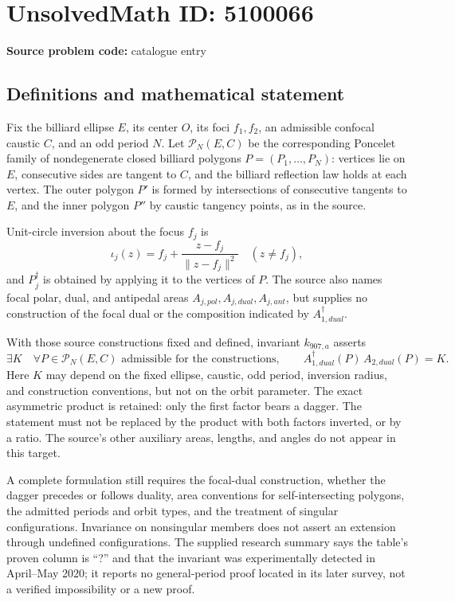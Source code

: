 \documentclass[11pt]{article}
\begin{document}
\section*{UnsolvedMath ID: 5100066}
\textbf{Source problem code:} catalogue entry
\subsection{Definitions and mathematical statement}
Fix the billiard ellipse \(E\), its center \(O\), its foci \(f_1,f_2\), an admissible confocal caustic \(C\), and an odd period \(N\). Let \(\mathcal P_N(E,C)\) be the corresponding Poncelet family of nondegenerate closed billiard polygons \(P=(P_1,\ldots,P_N)\): vertices lie on \(E\), consecutive sides are tangent to \(C\), and the billiard reflection law holds at each vertex. The outer polygon \(P'\) is formed by intersections of consecutive tangents to \(E\), and the inner polygon \(P''\) by caustic tangency points, as in the source.

Unit-circle inversion about the focus \(f_j\) is
\[
\iota_j(z)=f_j+\frac{z-f_j}{\|z-f_j\|^2}\quad(z\ne f_j),
\]
and \(P_j^\dagger\) is obtained by applying it to the vertices of \(P\). The source also names focal polar, dual, and antipedal areas \(A_{j,pol},A_{j,dual},A_{j,ant}\), but supplies no construction of the focal dual or the composition indicated by \(A_{1,dual}^\dagger\).

With those source constructions fixed and defined, invariant \(k_{907,a}\) asserts
\[
\exists K\quad\forall P\in\mathcal P_N(E,C)\text{ admissible for the constructions},
\qquad A_{1,dual}^\dagger(P)\,A_{2,dual}(P)=K.
\]
Here \(K\) may depend on the fixed ellipse, caustic, odd period, inversion radius, and construction conventions, but not on the orbit parameter. The exact asymmetric product is retained: only the first factor bears a dagger. The statement must not be replaced by the product with both factors inverted, or by a ratio. The source's other auxiliary areas, lengths, and angles do not appear in this target.

A complete formulation still requires the focal-dual construction, whether the dagger precedes or follows duality, area conventions for self-intersecting polygons, the admitted periods and orbit types, and the treatment of singular configurations. Invariance on nonsingular members does not assert an extension through undefined configurations. The supplied research summary says the table's proven column is ``?'' and that the invariant was experimentally detected in April--May 2020; it reports no general-period proof located in its later survey, not a verified impossibility or a new proof.
\end{document}
